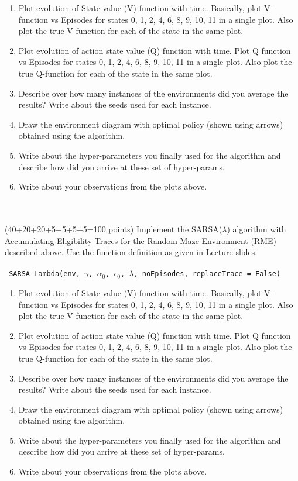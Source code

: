 \documentclass[a4 paper]{article}
\numberwithin{equation}{section}
\newcommand{\problem}[2]{~\\\fbox{\textbf{Problem #1}}\\(#2 points)\newline\newline}
\newcommand{\0}{\mathbf{0}}
\begin{document}
\begin{enumerate}[label=(\alph*)]
\item Plot evolution of State-value (V) function with time. Basically, plot V-function vs Episodes for states 0, 1, 2, 4, 6, 8,  9, 10, 11 in a single plot. Also plot the true V-function for each of the state in the same plot. 
\item Plot evolution of action state value (Q) function with time. Plot Q function vs Episodes for states 0, 1, 2, 4, 6, 8, 9, 10, 11 in a single plot. Also plot the true Q-function for each of the state in the same plot.  
\item Describe over how many instances of the environments did you average the results? Write about the seeds used for each instance. 
\item Draw the environment diagram with optimal policy (shown using arrows) obtained using the algorithm.  
\item Write about the hyper-parameters you finally used for the algorithm and describe how did you arrive at these set of hyper-params. 
\item Write about your observations from the plots above.
\end{enumerate}


\problem{7: SARSA($\lambda$) Accumulating}{40+20+20+5+5+5+5=100}
Implement the SARSA($\lambda$) algorithm with Accumulating Eligibility Traces for the Random Maze Environment (RME) described above. Use the function definition as given in Lecture slides.  \\
\\
\texttt{
SARSA-Lambda(env, $\gamma$, $\alpha_{0}$, $\epsilon_{0}$, $\lambda$, noEpisodes, replaceTrace = False)
}

\begin{enumerate}[label=(\alph*)]
\item Plot evolution of State-value (V) function with time. Basically, plot V-function vs Episodes for states 0, 1, 2, 4, 6, 8,  9, 10, 11 in a single plot. Also plot the true V-function for each of the state in the same plot. 
\item Plot evolution of action state value (Q) function with time. Plot Q function vs Episodes for states 0, 1, 2, 4, 6, 8, 9, 10, 11 in a single plot. Also plot the true Q-function for each of the state in the same plot.  
\item Describe over how many instances of the environments did you average the results? Write about the seeds used for each instance. 
\item Draw the environment diagram with optimal policy (shown using arrows) obtained using the algorithm.  
\item Write about the hyper-parameters you finally used for the algorithm and describe how did you arrive at these set of hyper-params. 
\item Write about your observations from the plots above.
\end{enumerate}
\end{document}
